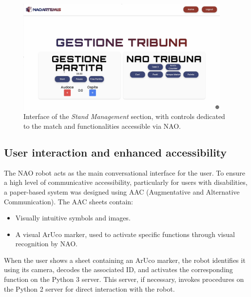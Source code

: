 \documentclass{optica-article}
\begin{document}
\begin{figure}[h!]
    \centering
    \includegraphics[width=0.95\textwidth]{figures/gestione_tribuna.png}
    \caption{Interface of the \textit{Stand Management} section, with controls dedicated to the match and functionalities accessible via NAO.}
    \label{fig:gestione_tribuna}
\end{figure}

\subsection{User interaction and enhanced accessibility}
The NAO robot acts as the main conversational interface for the user. To ensure a high level of communicative accessibility, particularly for users with disabilities, a paper-based system was designed using AAC (Augmentative and Alternative Communication). The AAC sheets contain:
\begin{itemize}
    \item Visually intuitive symbols and images.
    \item A visual ArUco marker, used to activate specific functions through visual recognition by NAO.
\end{itemize}
When the user shows a sheet containing an ArUco marker, the robot identifies it using its camera, decodes the associated ID, and activates the corresponding function on the Python 3 server. This server, if necessary, invokes procedures on the Python 2 server for direct interaction with the robot.
\end{document}
